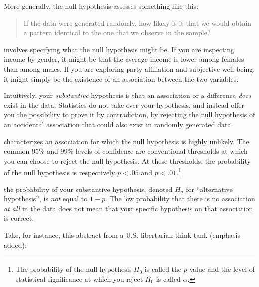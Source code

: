 More generally, the null hypothesis assesses something like this:

\begin{quote}
If the data were generated randomly, how likely is it that we would obtain a pattern identical to the one that we observe in the sample?
\end{quote}

 involves specifying what the null hypothesis might be. If you are inspecting income by gender, it might be that the average income is lower among females than among males. If you are exploring party affiliation and subjective well-being, it might simply be the existence of an association between the two variables. 

Intuitively, your \emph{substantive} hypothesis is that an association or a difference \emph{does} exist in the data. Statistics do not take over your hypothesis, and instead offer you the possibility to prove it by contradiction, by rejecting the null hypothesis of an accidental association that could also exist in randomly generated data.

 characterizes an association for which the null hypothesis is highly unlikely. The common 95\% and 99\% levels of confidence are conventional thresholds at which you can choose to reject the null hypothesis. At these thresholds, the probability of the null hypothesis is respectively $p < .05$ and $p < .01$.\footnote{The probability of the null hypothesis $H_0$ is called the $p$-value and the level of statistical significance at which you reject $H_0$ is called $\alpha$.}

 the probability of your substantive hypothesis, denoted $H_a$ for ``alternative hypothesis'', is \emph{not} equal to $1 - p$. The low probability that there is no association \emph{at all} in the data does not mean that your specific hypothesis on that association is correct.

Take, for instance, this abstract from a U.S. libertarian think tank (emphasis added):

